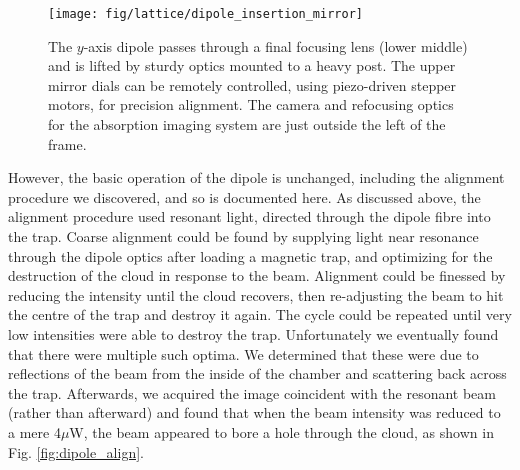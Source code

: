 	\begin{figure}
		\begin{minipage}{0.43\textwidth}
		\vspace{0cm}
		\caption{The $y$-axis dipole passes through a final focusing lens (lower middle) and is lifted by sturdy optics mounted to a heavy post.
	The upper mirror dials can be remotely controlled, using piezo-driven stepper motors, for precision alignment.
	The camera and refocusing optics for the absorption imaging system are just outside the left of the frame.}
		\label{fig:lifetime}
		\end{minipage}
		\hfill
		\begin{minipage}{0.55\textwidth}
		\vspace{0cm}
		\texttt{[image: fig/lattice/dipole\_insertion\_mirror]} %
		\end{minipage}
	\end{figure}


	
	However, the basic operation of the dipole is unchanged, including the alignment procedure we discovered, and so is documented here.
	As discussed above, the alignment procedure used resonant light, directed through the dipole fibre into the trap.
	Coarse alignment could be found by supplying light near resonance through the dipole optics after loading a magnetic trap, and optimizing for the destruction of the cloud in response to the beam.
	Alignment could be finessed by reducing the intensity until the cloud recovers, then re-adjusting the beam to hit the centre of the trap and destroy it again.
	The cycle could be repeated until very low intensities were able to destroy the trap.
	Unfortunately we eventually found that there were multiple such optima.
	We determined that these were due to reflections of the beam from the inside of the chamber and scattering back across the trap.
	Afterwards, we acquired the image coincident with the resonant beam (rather than afterward) and found that when the beam intensity was reduced to a mere 4$\mu$W, the beam appeared to bore a hole through the cloud, as shown in Fig.	\ref{fig:dipole_align}.
	
